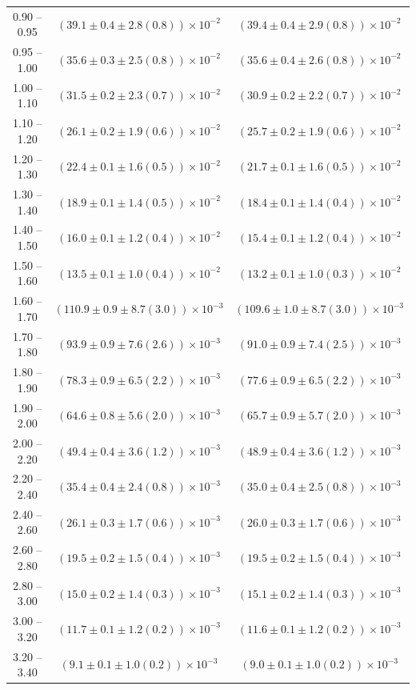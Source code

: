 \begin{table}
\begin{center}
\begin{tabular}{ c | c c }
0.90 -- 0.95 & $(39.1\pm0.4\pm2.8(0.8))\times10^{-2}$ & $(39.4\pm0.4\pm2.9(0.8))\times10^{-2}$ \\ 
0.95 -- 1.00 & $(35.6\pm0.3\pm2.5(0.8))\times10^{-2}$ & $(35.6\pm0.4\pm2.6(0.8))\times10^{-2}$ \\ 
1.00 -- 1.10 & $(31.5\pm0.2\pm2.3(0.7))\times10^{-2}$ & $(30.9\pm0.2\pm2.2(0.7))\times10^{-2}$ \\ 
1.10 -- 1.20 & $(26.1\pm0.2\pm1.9(0.6))\times10^{-2}$ & $(25.7\pm0.2\pm1.9(0.6))\times10^{-2}$ \\ 
1.20 -- 1.30 & $(22.4\pm0.1\pm1.6(0.5))\times10^{-2}$ & $(21.7\pm0.1\pm1.6(0.5))\times10^{-2}$ \\ 
1.30 -- 1.40 & $(18.9\pm0.1\pm1.4(0.5))\times10^{-2}$ & $(18.4\pm0.1\pm1.4(0.4))\times10^{-2}$ \\ 
1.40 -- 1.50 & $(16.0\pm0.1\pm1.2(0.4))\times10^{-2}$ & $(15.4\pm0.1\pm1.2(0.4))\times10^{-2}$ \\ 
1.50 -- 1.60 & $(13.5\pm0.1\pm1.0(0.4))\times10^{-2}$ & $(13.2\pm0.1\pm1.0(0.3))\times10^{-2}$ \\ 
1.60 -- 1.70 & $(110.9\pm0.9\pm8.7(3.0))\times10^{-3}$ & $(109.6\pm1.0\pm8.7(3.0))\times10^{-3}$ \\ 
1.70 -- 1.80 & $(93.9\pm0.9\pm7.6(2.6))\times10^{-3}$ & $(91.0\pm0.9\pm7.4(2.5))\times10^{-3}$ \\ 
1.80 -- 1.90 & $(78.3\pm0.9\pm6.5(2.2))\times10^{-3}$ & $(77.6\pm0.9\pm6.5(2.2))\times10^{-3}$ \\ 
1.90 -- 2.00 & $(64.6\pm0.8\pm5.6(2.0))\times10^{-3}$ & $(65.7\pm0.9\pm5.7(2.0))\times10^{-3}$ \\ 
2.00 -- 2.20 & $(49.4\pm0.4\pm3.6(1.2))\times10^{-3}$ & $(48.9\pm0.4\pm3.6(1.2))\times10^{-3}$ \\ 
2.20 -- 2.40 & $(35.4\pm0.4\pm2.4(0.8))\times10^{-3}$ & $(35.0\pm0.4\pm2.5(0.8))\times10^{-3}$ \\ 
2.40 -- 2.60 & $(26.1\pm0.3\pm1.7(0.6))\times10^{-3}$ & $(26.0\pm0.3\pm1.7(0.6))\times10^{-3}$ \\ 
2.60 -- 2.80 & $(19.5\pm0.2\pm1.5(0.4))\times10^{-3}$ & $(19.5\pm0.2\pm1.5(0.4))\times10^{-3}$ \\ 
2.80 -- 3.00 & $(15.0\pm0.2\pm1.4(0.3))\times10^{-3}$ & $(15.1\pm0.2\pm1.4(0.3))\times10^{-3}$ \\ 
3.00 -- 3.20 & $(11.7\pm0.1\pm1.2(0.2))\times10^{-3}$ & $(11.6\pm0.1\pm1.2(0.2))\times10^{-3}$ \\ 
3.20 -- 3.40 & $(9.1\pm0.1\pm1.0(0.2))\times10^{-3}$ & $(9.0\pm0.1\pm1.0(0.2))\times10^{-3}$ \\ 

\end{tabular}
\end{center}
\end{table}
